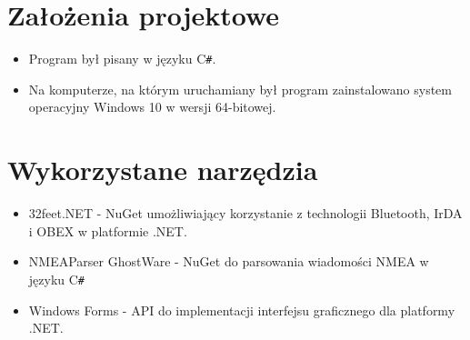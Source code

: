 \documentclass[12pt,a4paper,notitlepage]{report}
\begin{document}
\section{Założenia projektowe}
\begin{itemize}
\item Program był pisany w języku C\texttt{\#}.
\item Na komputerze, na którym uruchamiany był program zainstalowano system operacyjny Windows 10 w wersji 64-bitowej.
\end{itemize}

\section{Wykorzystane narzędzia}
\begin{itemize}
\item 32feet.NET - NuGet umożliwiający korzystanie z technologii Bluetooth, IrDA i OBEX w platformie .NET.
\item NMEAParser GhostWare - NuGet do parsowania wiadomości NMEA w języku C\texttt{\#}
\item Windows Forms - API do implementacji interfejsu graficznego dla platformy .NET.\end{itemize}
\end{document}
